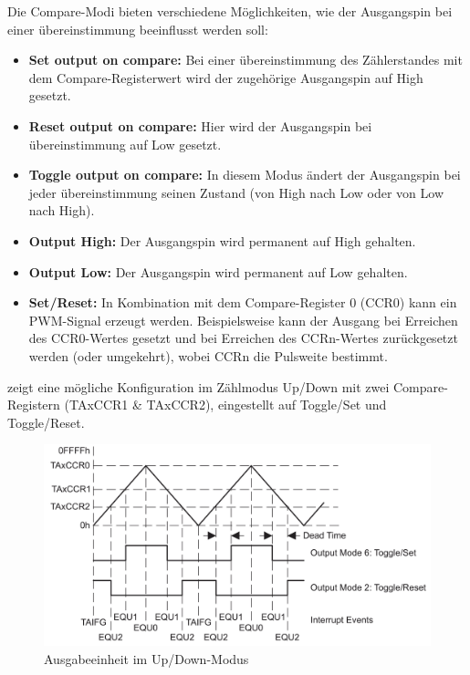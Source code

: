 Die Compare-Modi bieten verschiedene M\"oglichkeiten, wie der Ausgangspin bei einer \"ubereinstimmung beeinflusst werden soll:

\begin{itemize}
	\item \textbf{Set output on compare:} Bei einer \"ubereinstimmung des Z\"ahlerstandes mit dem Compare-Registerwert wird der zugeh\"orige Ausgangspin auf High gesetzt.

	\item \textbf{Reset output on compare:} Hier wird der Ausgangspin bei \"ubereinstimmung auf Low gesetzt.

	\item \textbf{Toggle output on compare:} In diesem Modus \"andert der Ausgangspin bei jeder \"ubereinstimmung seinen Zustand (von High nach Low oder von Low nach High).

	\item \textbf{Output High:} Der Ausgangspin wird permanent auf High gehalten.

	\item \textbf{Output Low:} Der Ausgangspin wird permanent auf Low gehalten.

	\item \textbf{Set/Reset:} In Kombination mit dem Compare-Register 0 (CCR0) kann ein PWM-Signal erzeugt werden. Beispielsweise kann der Ausgang bei Erreichen des CCR0-Wertes gesetzt und bei Erreichen des CCRn-Wertes zur\"uckgesetzt werden (oder umgekehrt), wobei CCRn die Pulsweite bestimmt.
\end{itemize}

 zeigt eine m\"ogliche Konfiguration im Z\"ahlmodus Up/Down mit zwei Compare-Registern (TAxCCR1 \& TAxCCR2), eingestellt auf Toggle/Set und Toggle/Reset.

\begin{figure}[h!]
	\centering
	\includegraphics[width=1.0\textwidth]{../Bilder/UpDown_ModeBsp.png}
	\caption{Ausgabeeinheit im Up/Down-Modus\\}
	\label{fig:OutputUnit_UpDown_Mode}
\end{figure}

